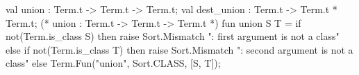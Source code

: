 \nwenddocs{}\plusendmoddef\nwstartdeflinemarkup{}\nwenddeflinemarkup
val union : Term.t -> Term.t -> Term.t;
val dest_union : Term.t -> Term.t * Term.t;
\nwendcode{}\nwdocspar
\nwenddocs{}\endmoddef\nwstartdeflinemarkup{}\nwenddeflinemarkup
(* union : Term.t -> Term.t -> Term.t *)
fun union S T =
  if not(Term.is_class S)
  then raise Sort.Mismatch ": first argument is not a class"
  else if not(Term.is_class T)
  then raise Sort.Mismatch ": second argument is not a class"
  else Term.Fun("union", Sort.CLASS, [S, T]);

